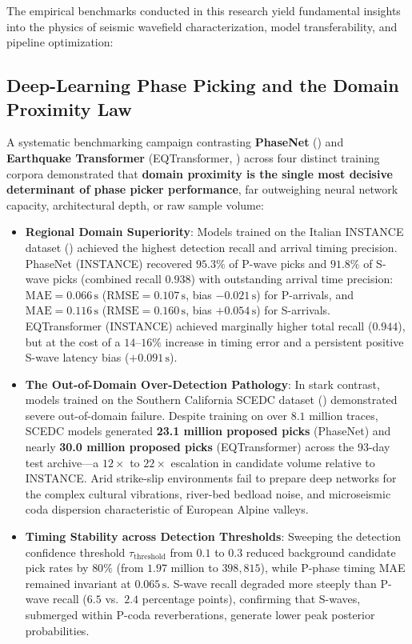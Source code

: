 The empirical benchmarks conducted in this research yield fundamental insights into the physics of seismic wavefield characterization, model transferability, and pipeline optimization:

\subsection{Deep-Learning Phase Picking and the Domain Proximity Law}
A systematic benchmarking campaign contrasting \textbf{PhaseNet} (\cite{PhaseNet}) and \textbf{Earthquake Transformer} (\ac{EQTransformer}, \cite{EQTransformer}) across four distinct training corpora demonstrated that \textbf{domain proximity is the single most decisive determinant of phase picker performance}, far outweighing neural network capacity, architectural depth, or raw sample volume:
\begin{itemize}
  \item \textbf{Regional Domain Superiority}: Models trained on the Italian \acf{INSTANCE} dataset (\cite{INSTANCE}) achieved the highest detection recall and arrival timing precision. PhaseNet (INSTANCE) recovered $95.3\%$ of P-wave picks and $91.8\%$ of S-wave picks (combined recall $0.938$) with outstanding arrival time precision: $\mathrm{MAE} = 0.066\,\unit{\second}$ ($\mathrm{RMSE} = 0.107\,\unit{\second}$, bias $-0.021\,\unit{\second}$) for P-arrivals, and $\mathrm{MAE} = 0.116\,\unit{\second}$ ($\mathrm{RMSE} = 0.160\,\unit{\second}$, bias $+0.054\,\unit{\second}$) for S-arrivals. EQTransformer (INSTANCE) achieved marginally higher total recall ($0.944$), but at the cost of a $14\text{--}16\%$ increase in timing error and a persistent positive S-wave latency bias ($+0.091\,\unit{\second}$).
  \item \textbf{The Out-of-Domain Over-Detection Pathology}: In stark contrast, models trained on the Southern California \ac{SCEDC} dataset (\cite{SCEDC}) demonstrated severe out-of-domain failure. Despite training on over $8.1$ million traces, SCEDC models generated \textbf{23.1 million proposed picks} (PhaseNet) and nearly \textbf{30.0 million proposed picks} (EQTransformer) across the 93-day test archive---a $12\times$ to $22\times$ escalation in candidate volume relative to INSTANCE. Arid strike-slip environments fail to prepare deep networks for the complex cultural vibrations, river-bed bedload noise, and microseismic coda dispersion characteristic of European Alpine valleys.
  \item \textbf{Timing Stability across Detection Thresholds}: Sweeping the detection confidence threshold $\tau_{\mathrm{threshold}}$ from $0.1$ to $0.3$ reduced background candidate pick rates by $80\%$ (from $1.97$ million to $398{,}815$), while P-phase timing MAE remained invariant at $0.065\,\unit{\second}$. S-wave recall degraded more steeply than P-wave recall ($6.5$ vs.\ $2.4$ percentage points), confirming that S-waves, submerged within P-coda reverberations, generate lower peak posterior probabilities.
\end{itemize}

